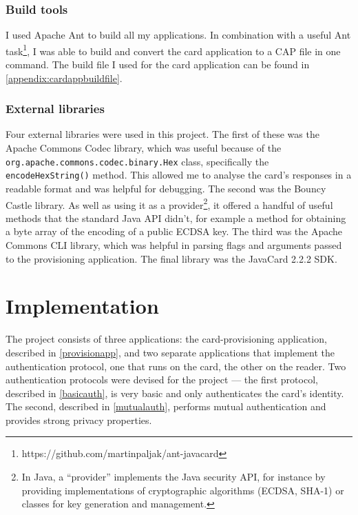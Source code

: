 \documentclass[12pt,a4paper,twoside,openright]{report}
\begin{document}
\subsection{Build tools}

I used Apache Ant \cite{ant} to build all my applications. In combination with a useful Ant task\footnote{https://github.com/martinpaljak/ant-javacard}, I was able to build and convert the card application to a CAP file in one command. The build file I used for the card application can be found in \autoref{appendix:cardappbuildfile}.

\subsection{External libraries}

Four external libraries were used in this project. The first of these was the Apache Commons Codec \cite{apachecommonscodec} library, which was useful because of the \texttt{org.apache.commons.codec.binary.Hex} class, specifically the \texttt{encodeHexString()} method. This allowed me to analyse the card's responses in a readable format and was helpful for debugging. The second was the Bouncy Castle \cite{bouncycastle} library. As well as using it as a provider\footnote{In Java, a ``provider'' implements the Java security API, for instance by providing implementations of cryptographic algorithms (ECDSA, SHA-1) or classes for key generation and management.}, it offered a handful of useful methods that the standard Java API didn't, for example a method for obtaining a byte array of the encoding of a public ECDSA key. The third was the Apache Commons CLI \cite{apachecommonscli} library, which was helpful in parsing flags and arguments passed to the provisioning application. The final library was the JavaCard 2.2.2 SDK.

\chapter{Implementation}

The project consists of three applications: the card-provisioning application, described in \autoref{provisionapp}, and two separate applications that implement the authentication protocol, one that runs on the card, the other on the reader. Two authentication protocols were devised for the project --- the first protocol, described in \autoref{basicauth}, is very basic and only authenticates the card's identity. The second, described in \autoref{mutualauth}, performs mutual authentication and provides strong privacy properties.
\end{document}

